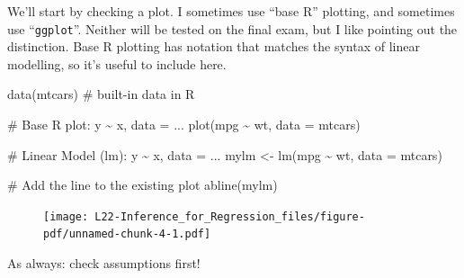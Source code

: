 \documentclass[
  letterpaper,
  DIV=11,
  numbers=noendperiod,
  oneside]{scrreprt}
\newenvironment{Shaded}{\begin{snugshade}}{\end{snugshade}}
\newcommand{\AttributeTok}[1]{\textcolor[rgb]{0.40,0.45,0.13}{#1}}
\newcommand{\CommentTok}[1]{\textcolor[rgb]{0.37,0.37,0.37}{#1}}
\newcommand{\FunctionTok}[1]{\textcolor[rgb]{0.28,0.35,0.67}{#1}}
\newcommand{\NormalTok}[1]{\textcolor[rgb]{0.00,0.23,0.31}{#1}}
\newcommand{\OtherTok}[1]{\textcolor[rgb]{0.00,0.23,0.31}{#1}}
\newcommand{\SpecialCharTok}[1]{\textcolor[rgb]{0.37,0.37,0.37}{#1}}
\begin{document}
We'll start by checking a plot. I sometimes use ``base R'' plotting, and
sometimes use ``\texttt{ggplot}''. Neither will be tested on the final
exam, but I like pointing out the distinction. Base R plotting has
notation that matches the syntax of linear modelling, so it's useful to
include here.

\begin{Shaded}
\begin{Highlighting}[]
\FunctionTok{data}\NormalTok{(mtcars) }\CommentTok{\# built{-}in data in R}

\CommentTok{\# Base R plot: y \textasciitilde{} x, data = ...}
\FunctionTok{plot}\NormalTok{(mpg }\SpecialCharTok{\textasciitilde{}}\NormalTok{ wt, }\AttributeTok{data =}\NormalTok{ mtcars)}

\CommentTok{\# Linear Model (lm): y \textasciitilde{} x, data = ...}
\NormalTok{mylm }\OtherTok{\textless{}{-}} \FunctionTok{lm}\NormalTok{(mpg }\SpecialCharTok{\textasciitilde{}}\NormalTok{ wt, }\AttributeTok{data =}\NormalTok{ mtcars)}

\CommentTok{\# Add the line to the existing plot}
\FunctionTok{abline}\NormalTok{(mylm)}
\end{Highlighting}
\end{Shaded}

\begin{figure}[H]

{\centering \texttt{[image: L22-Inference\_for\_Regression\_files/figure-pdf/unnamed-chunk-4-1.pdf]}

}

\end{figure}

As always: check assumptions first!
\end{document}
